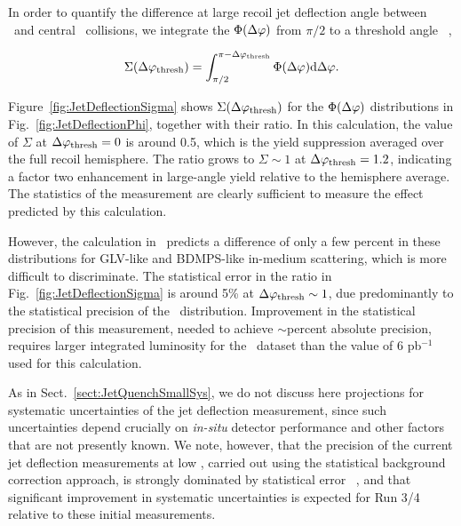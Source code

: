 In order to quantify the difference at large recoil jet deflection angle between \pp\ and central \PbPb\ collisions, we integrate the $\Phi(\Delta\varphi)$ from $\pi/2$ to a threshold angle \dphithresh~\cite{Adam:2015doa},

\begin{equation}
\Sigma(\Delta\varphi_{\mathrm{thresh}}) = 
\int_{\pi/2}^{\pi-\Delta\varphi_{\mathrm{thresh}}}
\Phi(\Delta\varphi)\mathrm{d}\Delta\varphi.
\label{eq:Sigma}
\end{equation}

\noindent
Figure~\ref{fig:JetDeflectionSigma} shows $\Sigma(\Delta\varphi_{\mathrm{thresh}})$ for the $\Phi(\Delta\varphi)$ distributions in Fig.~\ref{fig:JetDeflectionPhi}, together with their ratio. In this calculation, the value of $\Sigma$ at $\Delta\varphi_{\mathrm{thresh}}=0$ is around 0.5, which is the yield suppression averaged over the full recoil hemisphere. The ratio grows to $\Sigma\sim1$ at $\Delta\varphi_{\mathrm{thresh}}=1.2$, indicating a factor two enhancement in large-angle yield relative to the hemisphere average. The statistics of the measurement are clearly sufficient to measure the effect predicted by this calculation.

However, the calculation in~\cite{Gyulassy:2018qhr} predicts a difference of only a few percent in these distributions for GLV-like and BDMPS-like in-medium scattering, which is more difficult to discriminate. The statistical error in the ratio in Fig.~\ref{fig:JetDeflectionSigma} is around 5\% at $\Delta\varphi_{\mathrm{thresh}}\sim1$, due predominantly to the statistical precision of the \pp\ distribution. Improvement in the statistical precision of this measurement, needed to achieve $\sim$percent absolute precision, requires larger integrated luminosity for the \pp\ dataset than the value of 6 pb$^{-1}$ used for this calculation.

As in Sect.~\ref{sect:JetQuenchSmallSys}, we do not discuss here projections for systematic uncertainties of the jet deflection measurement, since such uncertainties depend crucially on {\it in-situ} detector performance and other factors that are not presently known. We note, however, that the precision of the current jet deflection measurements at low \ptjetch, carried out using the statistical background correction approach, is strongly dominated by statistical error ~\cite{Adam:2015doa,Adamczyk:2017yhe}, and that significant improvement in systematic uncertainties is expected for Run 3/4 relative to these initial measurements.  

